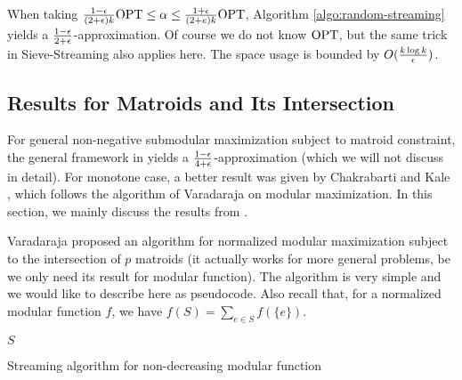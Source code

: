 When taking $\frac{1 - \epsilon}{(2 + \epsilon)k}\text{OPT}\leq \alpha \leq \frac{1 + \epsilon}{(2 + e)k}\text{OPT}$, Algorithm \ref{algo:random-streaming} yields a $\frac{1 - \epsilon}{2 + \epsilon}$-approximation. Of course we do not know $\text{OPT}$, but the same trick in {\sc Sieve-Streaming} also applies here. The space usage is bounded by $O(\frac{k\log k}{\epsilon})$.



\subsection{Results for Matroids and Its Intersection}
For general non-negative submodular maximization subject to matroid constraint, the general framework in \cite{CGQ15} yields a $\frac{1 - \epsilon}{4 + \epsilon}$-approximation (which we will not discuss in detail). For monotone case, a better result was given by Chakrabarti and Kale \cite{CK14}, which follows the algorithm of Varadaraja \cite{V11} on modular maximization. In this section, we mainly discuss the results from \cite{V11,CK14}.

Varadaraja \cite{V11} proposed an algorithm for normalized modular maximization subject to the intersection of $p$ matroids (it actually works for more general problems, be we only need its result for modular function). The algorithm is very simple and we would like to describe here as pseudocode. Also recall that, for a normalized modular function $f$, we have $f(S) = \sum_{e\in S}f(\{e\})$. 



\begin{algorithm}[H]
\DontPrintSemicolon %

 {
}
\Return $S$\;
\caption{Streaming algorithm for non-decreasing modular function}
\label{algo:streaming-modular}
\end{algorithm}

